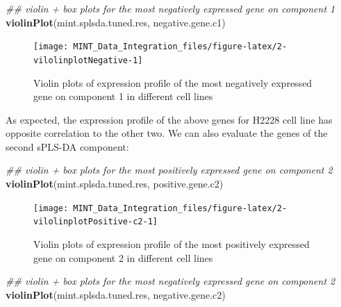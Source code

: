 \documentclass[]{book}
\newenvironment{Shaded}{\begin{snugshade}}{\end{snugshade}}
\newcommand{\CommentTok}[1]{\textcolor[rgb]{0.56,0.35,0.01}{\textit{#1}}}
\newcommand{\KeywordTok}[1]{\textcolor[rgb]{0.13,0.29,0.53}{\textbf{#1}}}
\newcommand{\NormalTok}[1]{#1}
\theoremstyle{definition}
\theoremstyle{definition}
\theoremstyle{definition}
\theoremstyle{remark}
\begin{document}
\begin{Shaded}
\begin{Highlighting}[]
\CommentTok{## violin + box plots for the most negatively expressed gene on component 1}
\KeywordTok{violinPlot}\NormalTok{(mint.splsda.tuned.res, negative.gene.c1)}
\end{Highlighting}
\end{Shaded}

\begin{figure}[ht]

{\centering \texttt{[image: MINT\_Data\_Integration\_files/figure-latex/2-vilolinplotNegative-1]} 

}

\caption{Violin plots of expression profile of the most negatively expressed gene  on component 1 in different cell lines}\label{fig:2-vilolinplotNegative}
\end{figure}

As expected, the expression profile of the above genes for H2228 cell
line has opposite correlation to the other two. We can also evaluate the
genes of the second sPLS-DA component:

\begin{Shaded}
\begin{Highlighting}[]
\CommentTok{## violin + box plots for the most positively expressed gene on component 2}
\KeywordTok{violinPlot}\NormalTok{(mint.splsda.tuned.res, positive.gene.c2)}
\end{Highlighting}
\end{Shaded}

\begin{figure}[ht]

{\centering \texttt{[image: MINT\_Data\_Integration\_files/figure-latex/2-vilolinplotPositive-c2-1]} 

}

\caption{Violin plots of expression profile of the most positively expressed gene on component 2 in different cell lines}\label{fig:2-vilolinplotPositive-c2}
\end{figure}

\begin{Shaded}
\begin{Highlighting}[]
\CommentTok{## violin + box plots for the most negatively expressed gene on component 2}
\KeywordTok{violinPlot}\NormalTok{(mint.splsda.tuned.res, negative.gene.c2)}
\end{Highlighting}
\end{Shaded}
\end{document}
